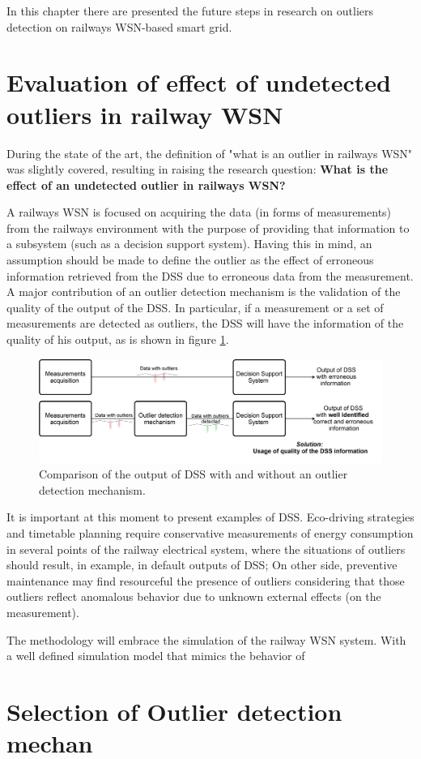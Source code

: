 In this chapter there are presented the future steps in research on outliers detection on railways WSN-based smart grid.


\section{Evaluation of effect of undetected outliers in railway WSN}


During the state of the art, the definition of "what is an outlier in railways WSN" was slightly covered, resulting in raising the research question: \textbf{What is the effect of an undetected outlier in railways WSN?}

A railways WSN is focused on acquiring the data (in forms of measurements) from the railways environment with the purpose of providing that information to a subsystem (such as a decision support system). Having this in mind, an assumption should be made to define the outlier as the effect of erroneous information retrieved from the DSS due to erroneous data from the measurement. A major contribution of an outlier detection mechanism is the validation of the quality of the output of the DSS. In particular, if a measurement or a set of measurements are detected as outliers, the DSS will have the information of the quality of his output, as is shown in figure \ref{fig:evaluation}.

\begin{figure}[h!]
	\centering
	\includegraphics[width=1.03\textwidth,keepaspectratio]{figures/evaluation}
	\caption{Comparison of the output of DSS with and without an outlier detection mechanism. }
	\label{fig:evaluation}
\end{figure}

It is important at this moment to present examples of DSS. Eco-driving strategies and timetable planning require conservative measurements of energy consumption in several points of the railway electrical system, where the situations of outliers should result, in example, in default outputs of DSS; On other side, preventive maintenance may find resourceful the presence of outliers considering that those outliers reflect anomalous behavior due to unknown external effects (on the measurement).


The methodology will embrace the simulation of the railway WSN system. With a well defined simulation model that mimics the behavior of


\section{Selection of Outlier detection mechan}

\lipsum[1]
